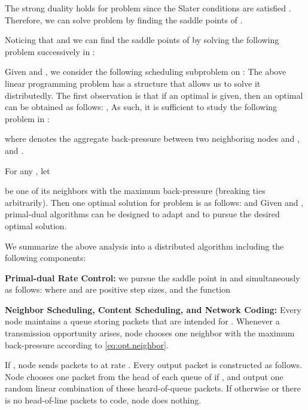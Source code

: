 \documentclass[10pt,conference]{IEEEtran}
\begin{document}
The strong duality holds for problem  since the Slater
conditions are satisfied \cite{Boyd04}. Therefore, we can solve problem  by finding the saddle points of .

Noticing that 
 and 
 we can find the saddle points of 
by solving the following problem successively in :



Given  and , we consider the following
scheduling subproblem on : 
 The above linear programming problem has a structure that allows
us to solve it distributedly. The first observation is that if
an optimal  is given, then an optimal 
can be obtained as follows: , 
 As such, it is sufficient to study the following problem in :

 where 
 denotes the aggregate back-pressure between two neighboring nodes
 and , and .

For any , let

be one of its neighbors with the maximum back-pressure (breaking ties
arbitrarily). Then one optimal solution for problem 
is as follows:
 and 
 Given  and , primal-dual
algorithms can be designed to adapt  and 
to pursue the desired optimal solution.

We summarize the above analysis into a distributed algorithm including
the following components:

\textbf{Primal-dual Rate Control: }we pursue the saddle point in 
and  simultaneously as follows: 
 where  and  are positive step sizes, and the function



\textbf{Neighbor Scheduling, Content Scheduling, and Network Coding:}
Every node  maintains a queue storing packets that are intended
for . Whenever a transmission opportunity arises, node  chooses
one neighbor  with the maximum back-pressure according to \eqref{eq:opt.neighbor}.

If , node  sends packets to  at rate
. Every output packet is constructed as follows. Node 
chooses one packet from the head of each queue of  if ,
and output one random linear combination of these heard-of-queue packets.
If otherwise  or there is no head-of-line packets
to code, node  does nothing.
\end{document}
